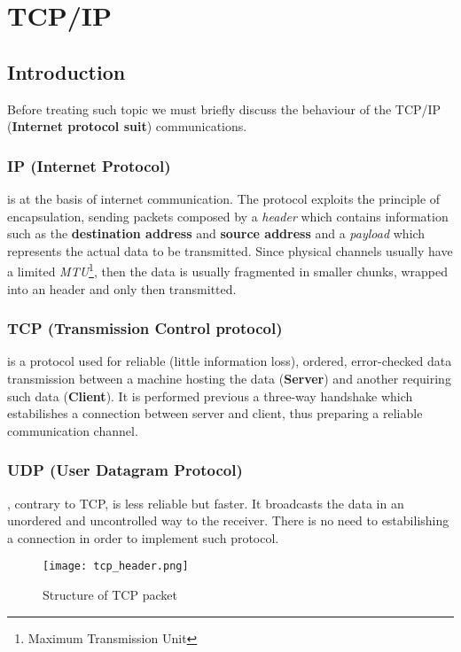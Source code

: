 \documentclass[../../main.tex]{subfiles}
\begin{document}
    

\section{TCP/IP}
\subsection{Introduction}
Before treating such topic we must briefly discuss the behaviour of the
TCP/IP (\textbf{Internet protocol suit}) communications.

\subsubsection{IP (Internet Protocol)} is at the basis of internet
communication. The protocol exploits the principle of encapsulation, sending
packets composed by a \emph{header} which contains information such as the
\textbf{destination address} and \textbf{source address} and a
\emph{payload} which represents the actual data to be transmitted.
Since physical channels usually have a limited \emph{MTU}\footnote{Maximum
Transmission Unit}, then the data is usually fragmented in smaller chunks,
wrapped into an header and only then transmitted.

\subsubsection{TCP (Transmission Control protocol)} is a protocol used for
reliable (little information loss), ordered, error-checked data transmission
between a machine hosting the data (\textbf{Server}) and another requiring
such data (\textbf{Client}). It is performed previous a three-way handshake
which estabilishes a connection between server and client, thus preparing a
reliable communication channel.

\subsubsection{UDP (User Datagram Protocol)}, contrary to TCP, is less reliable
but faster.
It broadcasts the data in an unordered and uncontrolled way to the receiver. 
There is no need to estabilishing a connection in order to implement such
protocol.

\begin{figure}[h]
    \centering
    \caption{Structure of TCP packet}
    \texttt{[image: tcp\_header.png]}
\end{figure}
\end{document}
